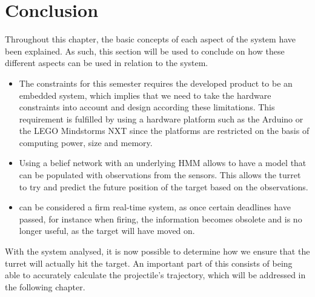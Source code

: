 \section{Conclusion}\label{EmbConc}

Throughout this chapter, the basic concepts of each aspect of the system have
been explained. As such, this section will be used to conclude on how these
different aspects can be used in relation to the \name system.

\begin{itemize}
  \item The constraints for this semester requires the developed product to be
  an embedded system, which implies that we need to take the
  hardware constraints into account and design according these limitations.
  This requirement is fulfilled by using a hardware platform such as the Arduino or
  the LEGO Mindstorms NXT since the platforms are restricted on the basis of
  computing power, size and memory.
  \item Using a belief network with an underlying HMM allows \name to have a
  model that can be populated with observations from the sensors. This allows
  the turret to try and predict the future position of the target based on the
  observations.
  \item \name can be considered a firm real-time system, as once certain
  deadlines have passed, for instance when firing, the information becomes
  obsolete and is no longer useful, as the target will have moved on. 
\end{itemize}  

With the system analysed, it is now possible to determine how we ensure that
the turret will actually hit the target. An important part of this consists of
being able to accurately calculate the projectile's trajectory, which will be
addressed in the following chapter.


% 
